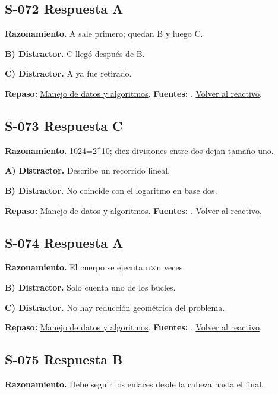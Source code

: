 \subsection*{S-072 \quad Respuesta A}\label{s:S-072}
\textbf{Razonamiento.} A sale primero; quedan B y luego C.

\textbf{B) Distractor. }C llegó después de B.

\textbf{C) Distractor. }A ya fue retirado.

\textbf{Repaso:} \hyperref[sec:s3]{Manejo de datos y algoritmos}. \textbf{Fuentes:} \cite{algorithms,postgres,ai}. \hyperref[q:S-072]{Volver al reactivo}.\par\medskip

\subsection*{S-073 \quad Respuesta C}\label{s:S-073}
\textbf{Razonamiento.} 1024=2\textasciicircum{}10; diez divisiones entre dos dejan tamaño uno.

\textbf{A) Distractor. }Describe un recorrido lineal.

\textbf{B) Distractor. }No coincide con el logaritmo en base dos.

\textbf{Repaso:} \hyperref[sec:s3]{Manejo de datos y algoritmos}. \textbf{Fuentes:} \cite{algorithms,postgres,ai}. \hyperref[q:S-073]{Volver al reactivo}.\par\medskip

\subsection*{S-074 \quad Respuesta A}\label{s:S-074}
\textbf{Razonamiento.} El cuerpo se ejecuta n×n veces.

\textbf{B) Distractor. }Solo cuenta uno de los bucles.

\textbf{C) Distractor. }No hay reducción geométrica del problema.

\textbf{Repaso:} \hyperref[sec:s3]{Manejo de datos y algoritmos}. \textbf{Fuentes:} \cite{algorithms,postgres,ai}. \hyperref[q:S-074]{Volver al reactivo}.\par\medskip

\subsection*{S-075 \quad Respuesta B}\label{s:S-075}
\textbf{Razonamiento.} Debe seguir los enlaces desde la cabeza hasta el final.

